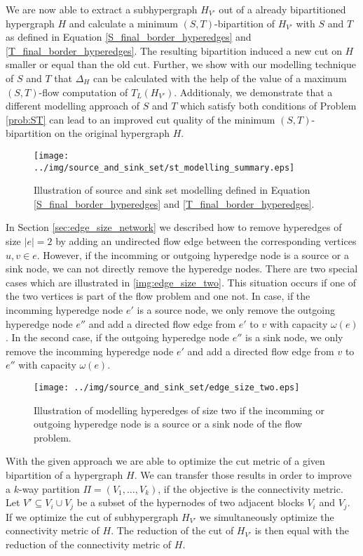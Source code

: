 We are now able to extract a subhypergraph $H_{V'}$ out of a already bipartitioned hypergraph $H$ and
calculate a minimum $(S,T)$-bipartition of $H_{V'}$ with $S$ and $T$ as defined
in Equation \ref{S_final_border_hyperedges} and \ref{T_final_border_hyperedges}. The resulting
bipartition induced a new cut on $H$ smaller or equal than the old cut. Further, we show with our
modelling technique of $S$ and $T$ that $\Delta_H$ can be calculated with the help of the value 
of a maximum $(S,T)$-flow computation of $T_L(H_{V'})$. Additionaly, we demonstrate that a different
modelling approach of $S$ and $T$ which satisfy both conditions of Problem \ref{prob:ST} can lead to
an improved cut quality of the minimum $(S,T)$-bipartition on the original hypergraph $H$.

\begin{figure}[ht!]
\centering
\texttt{[image: ../img/source\_and\_sink\_set/st\_modelling\_summary.eps]}
\caption{Illustration of source and sink set modelling defined in Equation \ref{S_final_border_hyperedges}
         and \ref{T_final_border_hyperedges}. }
\label{img:st_modelling_summary}
\end{figure}
In Section \ref{sec:edge_size_network} we described how to remove hyperedges of size $|e| = 2$ 
by adding an undirected flow edge between the corresponding vertices $u,v \in e$. However, if
the incomming or outgoing hyperedge node is a source or a sink node, we can not directly
remove the hyperedge nodes. There are two special cases which are illustrated
in \autoref{img:edge_size_two}. This situation occurs if one of the two vertices is part
of the flow problem and one not. In case, if the incomming hyperedge node $e'$ is a source node, 
we only remove the outgoing hyperedge node $e''$ and add a directed flow edge from $e'$ 
to $v$ with capacity $\omega(e)$. In the second case, if the outgoing hyperedge node $e''$ is
a sink node, we only remove the incomming hyperedge node $e'$ and add a directed flow edge from
$v$ to $e''$ with capacity $\omega(e)$.
\begin{figure}[ht!]
\centering
\texttt{[image: ../img/source\_and\_sink\_set/edge\_size\_two.eps]}
\caption{Illustration of modelling hyperedges of size two if the incomming or outgoing
         hyperedge node is a source or a sink node of the flow problem.}
\label{img:edge_size_two}
\end{figure}

With the given approach we are able to optimize the cut metric of a given
bipartition of a hypergraph $H$. We can transfer those results in order to improve
a $k$-way partition $\Pi = (V_1,\ldots,V_k)$, if the objective is the connectivity
metric. Let $V' \subseteq V_i \cup V_j$ be a subset of the hypernodes of two adjacent
blocks $V_i$ and $V_j$. If we optimize the cut of
subhypergraph $H_{V'}$ we simultaneously optimize the connectivity metric of $H$.
The reduction of the cut of $H_{V'}$ is then equal with the reduction of
the connectivity metric of $H$.


